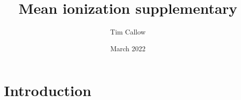 \documentclass{article}
\title{Mean ionization supplementary}
\author{Tim Callow}
\date{March 2022}
\begin{document}
\maketitle

\section{Introduction}
\end{document}
